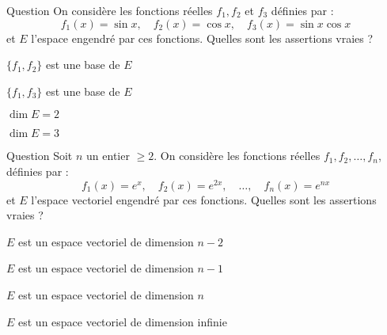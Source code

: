 \begin{multi}[multiple,feedback=
{Soit \(a,b,c \in \Rr\) tels que  \(af_1+bf_2+cf_3=0\). Alors, 
\[a\sin x +b\cos x+c\sin x \cos x = 0,\mbox{ pour tout }x\in \Rr.\] 
En prenant \(x=0\), puis, \(x=\frac{\pi}{2}\), on démontre que \(b=a=c=0\). Par conséquent, \(\{f_1, f_2, f_3\}\) est une base de \(E\) et donc \(\dim E =3\). 
}]{Question}
On considère les fonctions réelles \(f_1, f_2\) et \(f_3\) définies par : 
\[f_1(x)=\sin x,\quad f_2(x)= \cos x,\quad f_3(x)= \sin x \cos x\]
et \(E\) l'espace engendré par ces fonctions. Quelles sont les assertions vraies ?

    \item \(\{f_1,f_2\}\) est une base de \(E\)
    \item \(\{f_1,f_3\}\) est une base de \(E\)
    \item \(\dim E=2\)
    \item* \(\dim E=3\)
\end{multi}


\begin{multi}[multiple,feedback=
{Soit \(\lambda_1, \dots, \lambda_n\) des réels tels que \(\lambda_1e^x+ \dots+ \lambda_ne^{2x}=0,\)
pour tout réel \(x\). En divisant par \(e^x\) et en faisant tendre \(x\) vers \(-\infty\), on obtient \(\lambda_1=0\). Puis, en divisant par \(e^{2x}\) et en faisant tendre \(x\) vers \(-\infty\), on obtient \(\lambda_2=0\). En appliquant ce raisonnement \(n\) fois, on démontre que tous les \(\lambda_i\) sont nuls. Par conséquent,  
\(\{f_1, f_2,  \dots , f_n\}\) est une base de \(E\) et donc \(\dim E =n\).
}]{Question}
Soit \(n\) un entier \(\geq 2\). On considère les fonctions réelles \(f_1, f_2, \dots , f_n\), définies par :
\[f_1(x)=e^x,\quad f_2(x)= e^{2x},\quad \dots ,\quad f_n(x) = e^{nx}\]
et \(E\) l'espace vectoriel engendré par ces fonctions. Quelles sont les assertions vraies ?

    \item \(E\) est un espace vectoriel de dimension \(n-2\)
    \item \(E\) est un espace vectoriel de dimension \(n-1\)
    \item* \(E\) est un espace vectoriel de dimension \(n\)
    \item \(E\) est un espace vectoriel de dimension infinie
\end{multi}



